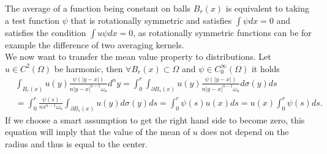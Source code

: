 \documentclass[A4,12pt,twoside]{book}
\begin{document}
The average of a function being constant on balls $B_r (x)$ is equivalent to taking a test function $\psi$ that is rotationally symmetric and satisfies $\int \psi dx=0$ and satisfies the condition $\int u \psi dx=0$, as rotationally symmetric functions can be for example the difference of two averaging kernels.\\
We now want to transfer the mean value property to distributions. Let $u \in C^2 (\Omega)$ be harmonic, then $\forall B_r (x) \subset \Omega$ and $\psi \in C_0^\infty (\Omega)$ it holds 
    \begin{align*}
        &\int_{B_r (x)} u(y) \frac{\psi (|y-x|)}{n |y-x|^{n-1} \omega_n} d^n y = \int_0^r \int_{\partial B_s (x)} u(y) \frac{\psi (|y-x|)}{n |y-x|^{n-1} \omega_n} d \sigma (y) ds \\
        &= \int_0^r \frac{\psi (s)}{n s^{n-1} \omega_n} \int_{\partial B_s (x)} u(y) d \sigma (y) ds = \int_0^r \psi (s) u(x) ds = u(x) \int_0^r \psi (s) ds.
    \end{align*}
If we choose a smart assumption to get the right hand side to become zero, this equation will imply that the value of the mean of $u$ does not depend on the radius and thus is equal to the center.
\end{document}

